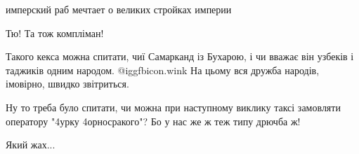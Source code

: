 \begin{itemize}
имперский раб мечтает о великих стройках империи

 
Тю! Та тож компліман!

 

Такого кекса можна спитати, чиї Самарканд із Бухарою, і чи вважає він узбеків і
таджиків одним народом.  @igg{fbicon.wink}  На цьому вся дружба народів, імовірно, швидко
звітриться.


 

Ну то треба було спитати, чи можна при наступному виклику таксі замовляти
оператору "4урку 4орносракого"? Бо у нас же ж теж типу дрючба ж!


 
Який жах...


\end{itemize}

